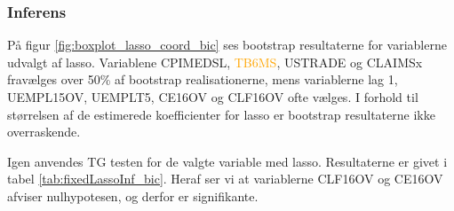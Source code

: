 \subsubsection{Inferens}
På figur \ref{fig:boxplot_lasso_coord_bic} ses bootstrap resultaterne for variablerne udvalgt af lasso.
Variablene \textcolor{cadetblue2}{CPIMEDSL}, \textcolor{orange}{TB6MS}, \textcolor{blue3}{USTRADE} og \textcolor{blue3}{CLAIMSx} fravælges over 50\% af bootstrap realisationerne, mens variablerne \textcolor{blue3}{lag 1}, \textcolor{blue3}{UEMPL15OV}, \textcolor{blue3}{UEMPLT5}, \textcolor{blue3}{CE16OV} og \textcolor{blue3}{CLF16OV} ofte vælges.
I forhold til størrelsen af de estimerede koefficienter for lasso er bootstrap resultaterne ikke overraskende. 
%
%

Igen anvendes TG testen for de valgte variable med lasso.
Resultaterne er givet i tabel \ref{tab:fixedLassoInf_bic}.
Heraf ser vi at variablerne \textcolor{blue3}{CLF16OV} og \textcolor{blue3}{CE16OV} afviser nulhypotesen, og derfor er signifikante.





